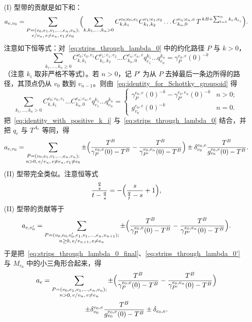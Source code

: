 (I) 型带的贡献是如下和：
\begin{equation}\label{eq:strips_through_lambda_0}
a_{e,v_0}=\sum_{\substack{P=(v_0,e_1,v_1,\dots,e_n,v_n);\\ e/v_n,\,e\neq e_n,\,e_1\neq e_0}}\Bigl(\sum_{k,k_1,\dots,k_n>0}C^{v_0;e_0,e_1}_{k,k_1}C^{v_1;e_1,e_2}_{k_1,k_2}\dots C^{v_n;e_n,e}_{k_n,0}\,T^{\,kB+\sum_{l=1}^n k_i A_{e_i}}\Bigr).
\end{equation}
注意如下恒等式：对~\eqref{eq:strips_through_lambda_0} 中的约化路径 $P$ 与 $k>0$，
\begin{equation}\label{eq:identity_for_Schottky_groupoid}
\sum_{k_1,\dots,k_n\geq 0}C^{v_0;e_0,e_1}_{k,k_1}C^{v_1;e_1,e_2}_{k_1,k_2}\dots C^{v_n;e_n,e}_{k_n,0}q_{e_1}^{k_1}\dots q_{e_n}^{k_n}=\gamma_P^{e_0,e}(0)^{-k}
\end{equation}
（注意 $k_i$ 取非严格不等式）。若 $n>0$，记 $P'$ 为从 $P$ 去掉最后一条边所得的路径，其顶点仍从 $v_0$ 数到 $v_{n-1}$。则由~\eqref{eq:identity_for_Schottky_groupoid} 得
\begin{equation}\label{eq:identity_with_positive_k_i}
\sum_{k_1,\dots,k_n>0}C^{v_0;e_0,e_1}_{k,k_1}\dots C^{v_n;e_n,e}_{k_n,0}q_{e_1}^{k_1}\dots q_{e_n}^{k_n}
=\begin{cases}\gamma_P^{e_0,e}(0)^{-k}-\gamma_{P'}^{e_0,e_{n}}(0)^{-k} & n>0;\\
g_{v_0}^{e_0,e}(0)^{-k} & n=0.\end{cases}
\end{equation}
把~\eqref{eq:identity_with_positive_k_i} 与~\eqref{eq:strips_through_lambda_0} 结合，并把 $q_{e}$ 与 $T^{A_{e}}$ 等同，得
\begin{equation}\label{eq:strips_through_lambda_0_final}
a_{e,v_0}=\sum_{\substack{P=(v_0,e_1,v_1,\dots,e_n,v_n);\\ n>0,\,e/v_n,\,e\neq e_n,\,e_1\neq e_0}}\pm\Bigl(\frac{T^B}{\gamma_P^{e_0,e}(0)-T^B}-\frac{T^B}{\gamma_{P'}^{e_0,e_n}(0)-T^B}\Bigr)\pm\delta_{v_0}^{e_0,e}\frac{T^B}{g_{v_0}^{e_0,e}(0)-T^B}.
\end{equation}
(II) 型带完全类似。注意恒等式
\[
\frac{\frac{q}{s}}{t-\frac{q}{s}}=-\Bigl(\frac{s}{\frac{q}{t}-s}+1\Bigr),
\]
(II) 型带的贡献等于
\begin{equation}\label{eq:strips_through_lambda_0'}
a_{e,v_0'}=\sum_{\substack{P=(v_0,e_0,v_0',e_1,v_1,\dots,e_n,v_{n+1});\\ n\geq 0,\,e/v_{n+1},\,e\neq e_n}}\pm\Bigl(\frac{T^B}{\gamma_P^{e_0,e}(0)-T^B}-\frac{T^B}{\gamma_{P'}^{e_0,e_n}(0)-T^B}\Bigr).
\end{equation}
于是把~\eqref{eq:strips_through_lambda_0_final}、\eqref{eq:strips_through_lambda_0'} 与 $M_{e_0}$ 中的小三角形合起来，得
\begin{multline}
a_{e}=\sum_{\substack{P=(v_0,e_1,v_1,\dots,e_n,v_n);\\ n>0,\,e/v_n,\,e\neq e_n}}\pm\Bigl(\frac{T^B}{\gamma_P^{e_0,e}(0)-T^B}-\frac{T^B}{\gamma_{P'}^{e_0,e_n}(0)-T^B}\Bigr)\\
\pm\delta_{v_0}^{e_0,e}\frac{T^B}{g_{v_0}^{e_0,e}(0)-T^B}
\pm\delta_{e_0,e}.
\end{multline}

